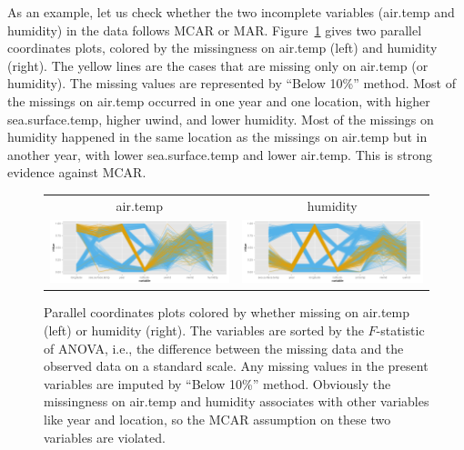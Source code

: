 \documentclass[article]{jss}
\begin{document}
As an example, let us check whether the two incomplete variables
(air.temp and humidity) in the data  follows MCAR or MAR.
Figure~\ref{fig:pcpCheck} gives two parallel coordinates plots,
colored by the missingness on air.temp (left) and humidity (right).
The yellow lines are the cases that are missing only on air.temp
(or humidity). The missing values are represented by ``Below 10\%''
method. Most of the missings on air.temp occurred in one year and
one location, with higher sea.surface.temp, higher uwind, and
lower humidity. Most of the missings on humidity happened in the
same location as the missings on air.temp but in another year,
with lower sea.surface.temp and lower air.temp. This is strong
evidence against MCAR.

\begin{center}
\begin{figure}[h]
\begin{centering}
\begin{tabular}{cc}
{\tiny{air.temp}} & {\tiny{humidity}}\tabularnewline
\includegraphics[width=.48\textwidth]{graph/fig12-2-air-temp-2} & 
\includegraphics[width=.48\textwidth]{graph/fig12-3-humidity-2} \tabularnewline
\end{tabular}
\par\end{centering}
\caption{Parallel coordinates plots colored by whether
missing on air.temp (left) or humidity (right). The variables
are sorted by the $F$-statistic of ANOVA, i.e., the difference
between the missing data and the observed data on a standard
scale. Any missing values in the present variables are imputed
by ``Below 10\%'' method. Obviously the missingness on air.temp
and humidity associates with other variables like year and
location, so the MCAR assumption on these two variables are
violated.}
\label{fig:pcpCheck}
\end{figure}
\par\end{center}
\end{document}
